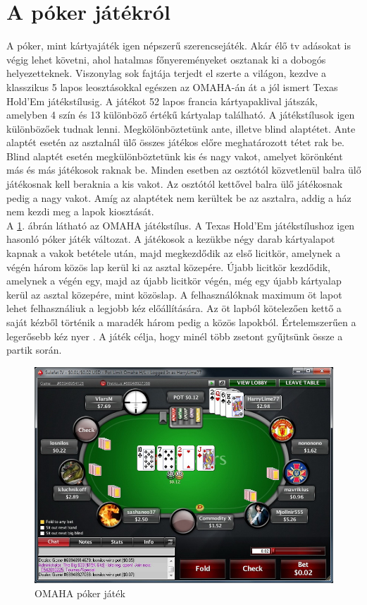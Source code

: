 \section{A póker játékról \cite{poker_game}}
A póker, mint kártyajáték igen népszerű szerencsejáték. Akár élő tv adásokat is végig lehet követni, ahol hatalmas főnyereményeket osztanak ki a dobogós helyezetteknek. Viszonylag sok fajtája terjedt el szerte a világon, kezdve a klasszikus 5 lapos leosztásokkal egészen az OMAHA-án át a jól ismert Texas Hold'Em játékstílusig. A játékot 52 lapos francia kártyapaklival játszák, amelyben 4 szín és 13 különböző értékű kártyalap található. A játékstílusok igen különbözőek tudnak lenni. Megkölönböztetünk ante, illetve blind alaptétet. Ante alaptét esetén az asztalnál ülő összes játékos előre meghatározott tétet rak be. Blind alaptét esetén megkülönböztetünk kis és nagy vakot, amelyet körönként más és más játékosok raknak be. Minden esetben az osztótól közvetlenül balra ülő játékosnak kell beraknia a kis vakot. Az osztótól kettővel balra ülő játékosnak pedig a nagy vakot. Amíg az alaptétek nem kerültek be az asztalra, addig a ház nem kezdi meg a lapok kiosztását. \\
A \ref{fig:omaha}. ábrán látható az OMAHA \cite{omaha_poker} játékstílus. A Texas Hold'Em játékstílushoz igen hasonló póker játék változat. A játékosok a kezükbe négy darab kártyalapot kapnak a vakok betétele után, majd megkezdődik az első licitkör, amelynek a végén három közös lap kerül ki az asztal közepére. Újabb licitkör kezdődik, amelynek a végén egy, majd az újabb licitkör végén, még egy újabb kártyalap kerül az asztal közepére, mint közöslap. A felhasználóknak maximum öt lapot lehet felhasználiuk a legjobb kéz előállítására. Az öt lapból kötelezően kettő a saját kézből történik a maradék három pedig a közös lapokból. Értelemszerűen a legerősebb kéz nyer \cite{card_combinations}. A játék célja, hogy minél több zsetont gyűjtsünk össze a partik során.
\begin{figure}[h!]
  \caption{OMAHA póker játék}
  \label{fig:omaha}
  \centering
    \includegraphics[width=\textwidth]{user-documentation/images/omaha.jpg}
\end{figure}

